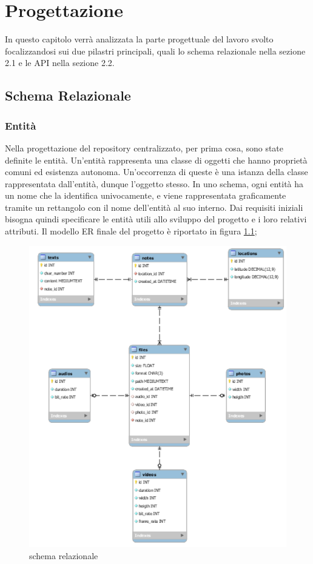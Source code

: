 \chapter{Progettazione}

In questo capitolo verrà analizzata la parte progettuale del lavoro svolto focalizzandosi sui due pilastri principali, quali lo schema relazionale nella sezione 2.1 e le API nella sezione 2.2.

\section{Schema Relazionale} 
\subsection{Entità}
Nella progettazione del repository centralizzato, per prima cosa, sono state definite le entità. Un'entità rappresenta una classe di oggetti che hanno proprietà comuni ed esistenza autonoma. Un'occorrenza di queste è una istanza della classe rappresentata dall'entità, dunque l'oggetto stesso. In uno schema, ogni entità ha un nome che la identifica univocamente, e viene rappresentata graficamente tramite un rettangolo con il nome dell'entità al suo interno.
Dai requisiti iniziali bisogna quindi specificare le entità utili allo sviluppo del progetto e i loro relativi attributi. Il modello ER \citep{rif8} finale del progetto è riportato in figura \ref{fig:ERModel};

\begin{figure}[!h]
	\centering
	\includegraphics{schemaER.png}
	\caption{schema relazionale}
	\label{fig:ERModel}
\end{figure}

